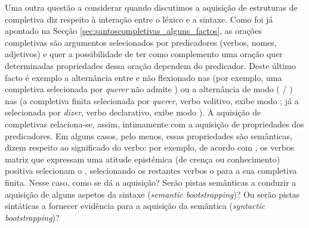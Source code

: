 \documentclass[output=paper]{LSP/langsci}
\begin{document}
Uma outra questão a considerar quando discutimos a aquisição de estruturas de  completiva diz respeito à interação entre o léxico e a sintaxe. Como foi já apontado na Secção \ref{sec:santoscompletivas_alguns_factos}, as orações completivas são argumentos selecionados por predicadores (verbos, nomes, adjetivos) e quer a possibilidade de ter como complemento uma oração quer determinadas propriedades dessa oração dependem do predicador. Deste último facto é exemplo a alternância entre  e não flexionado nas  (por exemplo, uma completiva selecionada por \textit{querer} não admite ) ou a alternância de modo ( / ) nas  (a completiva finita selecionada por \textit{querer}, verbo volitivo, exibe modo ; já a selecionada por \textit{dizer}, verbo declarativo, exibe modo ). A aquisição de completivas relaciona-se, assim, intimamente com a aquisição de propriedades dos predicadores. Em alguns casos, pelo menos, essas propriedades são semânticas, dizem respeito ao significado do verbo: por exemplo, de acordo com \citet{marques1995}, os verbos matriz que expressam uma atitude epistémica (de crença ou conhecimento) positiva selecionam o , selecionando os restantes verbos o  para a sua completiva finita. Nesse caso, como se dá a aquisição? Serão pistas semânticas a conduzir a aquisição de alguns aspetos da sintaxe (\textit{semantic bootstrapping})? Ou serão pistas sintáticas a fornecer evidência para a aquisição da semântica (\textit{syntactic bootstrapping})?
\end{document}
